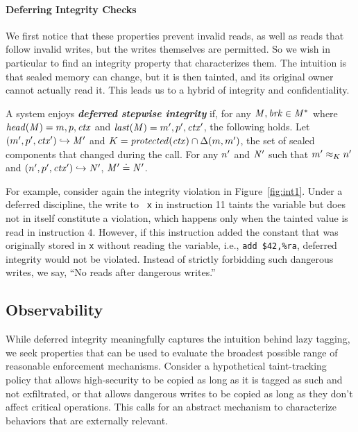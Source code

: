 \documentclass[acmsmall,review,anonymous]{acmart}\settopmatter{printfolios=true,printccs=false,printacmref=false}
\begin{document}
{\paragraph*{Deferring Integrity Checks}

We first notice that these properties prevent invalid reads, as well as reads
that follow invalid writes, but the writes themselves are permitted.
So we wish in particular to find an integrity property that characterizes them.
The intuition is that sealed memory can change, but it is
then tainted, and its original owner cannot actually read it. This
leads us to a hybrid of integrity and confidentiality.

A system enjoys \textbf{\textit{deferred stepwise integrity}} if,
for any \(\mathit{M},\mathit{brk} \in \mathit{M}^*\) where \(\mathit{head}(\mathit{M}) = m,p,\mathit{ctx}\) and
\(\mathit{last}(\mathit{M}) = m',p',\mathit{ctx}'\), the following holds. Let
\((m',p',\mathit{ctx}') \hookrightarrow \mathit{M}'\) and
\(K = \mathit{protected}(\mathit{ctx}) \cap \Delta(m,m')\), the
set of sealed components that changed during the call.
For any \(n'\) and \(\mathit{N}'\) such that \(m' \approx_{K} n'\) and
\((n',p',\mathit{ctx}') \hookrightarrow \mathit{N}'\), \(\mathit{M}' \doteq \mathit{N}'\).

For example, consider again the integrity violation in
Figure~\ref{fig:int1}. Under a deferred discipline, the write to {\tt
  x} in instruction 11 taints the variable but does not in itself
constitute a violation, which happens only when the tainted value is
read in instruction 4. However, if this instruction added the constant
that was originally stored in {\tt x} without reading the variable,
i.e., {\tt add \$42,\%ra}, deferred integrity would not be violated.
Instead of strictly forbidding such dangerous writes, we say,
``No reads after dangerous writes.''

\subsection{Observability}


While deferred integrity meaningfully captures the intuition
behind lazy tagging, we seek properties that can be used to evaluate the broadest
possible range of reasonable
enforcement mechanisms. Consider a hypothetical
taint-tracking policy that allows high-security to be copied as long as it is
tagged as such and not exfiltrated, or that allows dangerous writes to be
copied as long as they don't affect critical operations. This calls for
an abstract mechanism to characterize behaviors that are externally relevant.

}
\end{document}
